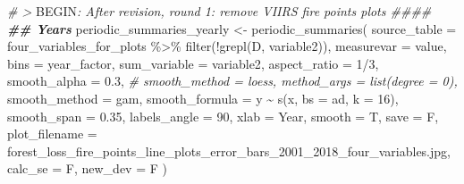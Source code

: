\documentclass[10pt,landscape,a3paper]{article}
\newenvironment{Shaded}{\begin{snugshade}}{\end{snugshade}}
\newcommand{\AttributeTok}[1]{\textcolor[rgb]{0.77,0.63,0.00}{#1}}
\newcommand{\CommentTok}[1]{\textcolor[rgb]{0.56,0.35,0.01}{\textit{#1}}}
\newcommand{\DecValTok}[1]{\textcolor[rgb]{0.00,0.00,0.81}{#1}}
\newcommand{\DocumentationTok}[1]{\textcolor[rgb]{0.56,0.35,0.01}{\textbf{\textit{#1}}}}
\newcommand{\FloatTok}[1]{\textcolor[rgb]{0.00,0.00,0.81}{#1}}
\newcommand{\FunctionTok}[1]{\textcolor[rgb]{0.00,0.00,0.00}{#1}}
\newcommand{\NormalTok}[1]{#1}
\newcommand{\OtherTok}[1]{\textcolor[rgb]{0.56,0.35,0.01}{#1}}
\newcommand{\RegionMarkerTok}[1]{#1}
\newcommand{\SpecialCharTok}[1]{\textcolor[rgb]{0.00,0.00,0.00}{#1}}
\newcommand{\StringTok}[1]{\textcolor[rgb]{0.31,0.60,0.02}{#1}}
\begin{document}
\begin{Shaded}
\begin{Highlighting}[]
\CommentTok{\# \textgreater{} }\RegionMarkerTok{BEGIN}\CommentTok{: After revision, round 1: remove VIIRS fire points plots \#\#\#\#}
\DocumentationTok{\#\# Years}
\NormalTok{periodic\_summaries\_yearly }\OtherTok{\textless{}{-}} \FunctionTok{periodic\_summaries}\NormalTok{(}
  \AttributeTok{source\_table =}\NormalTok{ four\_variables\_for\_plots }\SpecialCharTok{\%\textgreater{}\%} \FunctionTok{filter}\NormalTok{(}\SpecialCharTok{!}\FunctionTok{grepl}\NormalTok{(}\StringTok{\textquotesingle{}D\textquotesingle{}}\NormalTok{, variable2)), }\AttributeTok{measurevar =} \StringTok{\textquotesingle{}value\textquotesingle{}}\NormalTok{,}
  \AttributeTok{bins =} \StringTok{\textquotesingle{}year\_factor\textquotesingle{}}\NormalTok{, }\AttributeTok{sum\_variable =} \StringTok{\textquotesingle{}variable2\textquotesingle{}}\NormalTok{, }\AttributeTok{aspect\_ratio =} \DecValTok{1}\SpecialCharTok{/}\DecValTok{3}\NormalTok{, }\AttributeTok{smooth\_alpha =} \FloatTok{0.3}\NormalTok{,}
  \CommentTok{\# smooth\_method = \textquotesingle{}loess\textquotesingle{}, method\_args = list(degree = 0),}
  \AttributeTok{smooth\_method =} \StringTok{\textquotesingle{}gam\textquotesingle{}}\NormalTok{, }\AttributeTok{smooth\_formula =}\NormalTok{ y }\SpecialCharTok{\textasciitilde{}} \FunctionTok{s}\NormalTok{(x, }\AttributeTok{bs =} \StringTok{\textquotesingle{}ad\textquotesingle{}}\NormalTok{, }\AttributeTok{k =} \DecValTok{16}\NormalTok{),}
  \AttributeTok{smooth\_span =} \FloatTok{0.35}\NormalTok{, }\AttributeTok{labels\_angle =} \DecValTok{90}\NormalTok{, }\AttributeTok{xlab =} \StringTok{\textquotesingle{}Year\textquotesingle{}}\NormalTok{, }\AttributeTok{smooth =}\NormalTok{ T, }\AttributeTok{save =}\NormalTok{ F,}
  \AttributeTok{plot\_filename =} \StringTok{\textquotesingle{}forest\_loss\_fire\_points\_line\_plots\_error\_bars\_2001\_2018\_four\_variables.jpg\textquotesingle{}}\NormalTok{,}
  \AttributeTok{calc\_se =}\NormalTok{ F, }\AttributeTok{new\_dev =}\NormalTok{ F}
\NormalTok{)}
\end{Highlighting}
\end{Shaded}
\end{document}
